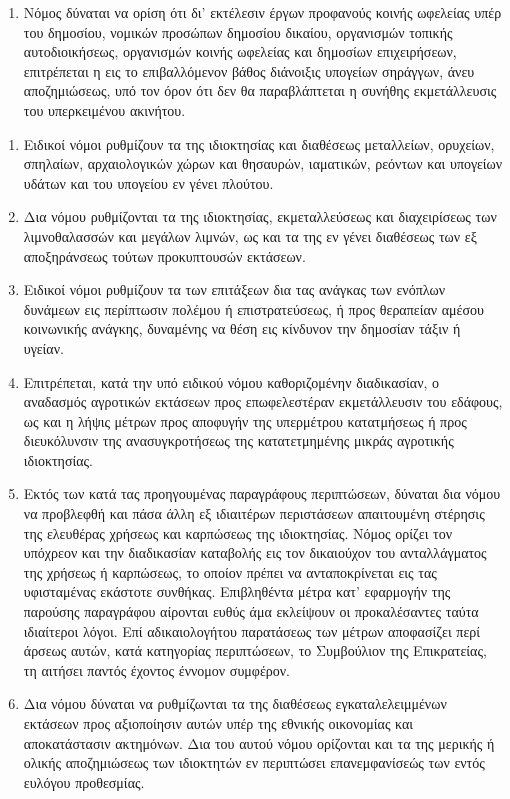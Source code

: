 \documentclass[twoside, a4paper, 10pt]{article}
\begin{document}
\begin{multicols}{2}
\begin{enumerate}
\begin{BigQuote}
\begin{enumerate}
  \item[7.] Νόμος δύναται να ορίση ότι δι' εκτέλεσιν έργων προφανούς κοινής ωφελείας υπέρ του δημοσίου, νομικών προσώπων δημοσίου δικαίου, οργανισμών τοπικής αυτοδιοικήσεως, οργανισμών κοινής ωφελείας και δημοσίων επιχειρήσεων, επιτρέπεται η εις το επιβαλλόμενον βάθος διάνοιξις υπογείων σηράγγων, άνευ αποζημιώσεως, υπό τον όρον ότι δεν θα παραβλάπτεται η συνήθης εκμετάλλευσις του υπερκειμένου ακινήτου.
\end{enumerate}

\begin{enumerate}
  \item[1.] Ειδικοί νόμοι ρυθμίζουν τα της ιδιοκτησίας και διαθέσεως μεταλλείων, ορυχείων, σπηλαίων, αρχαιολογικών χώρων και θησαυρών, ιαματικών, ρεόντων και υπογείων υδάτων και του υπογείου εν γένει πλούτου.
  \item[2.] Δια νόμου ρυθμίζονται τα της ιδιοκτησίας, εκμεταλλεύσεως και διαχειρίσεως των λιμνοθαλασσών και μεγάλων λιμνών, ως και τα της εν γένει διαθέσεως των εξ αποξηράνσεως τούτων προκυπτουσών εκτάσεων.
  \item[3.] Ειδικοί νόμοι ρυθμίζουν τα των επιτάξεων δια τας ανάγκας των ενόπλων δυνάμεων εις περίπτωσιν πολέμου ή επιστρατεύσεως, ή προς θεραπείαν αμέσου κοινωνικής ανάγκης, δυναμένης να θέση εις κίνδυνον την δημοσίαν τάξιν ή υγείαν.
  \item[4.] Επιτρέπεται, κατά την υπό ειδικού νόμου καθοριζομένην διαδικασίαν, ο αναδασμός αγροτικών εκτάσεων προς επωφελεστέραν  εκμετάλλευσιν του εδάφους, ως και η λήψις μέτρων προς αποφυγήν της υπερμέτρου κατατμήσεως ή προς διευκόλυνσιν της ανασυγκροτήσεως της κατατετμημένης μικράς αγροτικής ιδιοκτησίας.
  \item[5.] Εκτός των κατά τας προηγουμένας παραγράφους περιπτώσεων, δύναται δια νόμου να προβλεφθή και πάσα άλλη εξ ιδιαιτέρων περιστάσεων απαιτουμένη στέρησις της ελευθέρας χρήσεως και καρπώσεως της ιδιοκτησίας. Νόμος ορίζει τον υπόχρεον και την διαδικασίαν καταβολής εις τον δικαιούχον του ανταλλάγματος της χρήσεως ή καρπώσεως, το οποίον πρέπει να ανταποκρίνεται εις τας υφισταμένας εκάστοτε συνθήκας.
Επιβληθέντα μέτρα κατ' εφαρμογήν της παρούσης παραγράφου αίρονται ευθύς άμα εκλείψουν οι προκαλέσαντες ταύτα ιδιαίτεροι λόγοι. Επί αδικαιολογήτου παρατάσεως των μέτρων αποφασίζει περί άρσεως αυτών, κατά κατηγορίας περιπτώσεων, το Συμβούλιον της Επικρατείας, τη αιτήσει παντός έχοντος έννομον συμφέρον.
  \item[6.] Δια νόμου δύναται να ρυθμίζωνται τα της διαθέσεως εγκαταλελειμμένων εκτάσεων προς αξιοποίησιν αυτών υπέρ της εθνικής οικονομίας και αποκατάστασιν ακτημόνων. Δια του αυτού νόμου ορίζονται και τα της μερικής ή ολικής αποζημιώσεως των ιδιοκτητών εν περιπτώσει επανεμφανίσεώς των εντός ευλόγου προθεσμίας.

\end{enumerate}
\end{BigQuote}
\end{enumerate}
\end{multicols}
\end{document}
